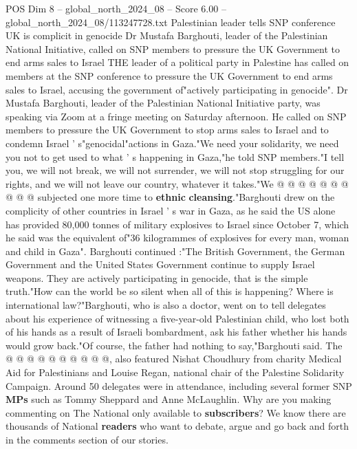 \begin{textsample}{POS Dim 8 – global\_north\_2024\_08 – Score 6.00 – global\_north\_2024\_08/113247728.txt}  \label{ex:f8_pos_321}
Palestinian leader tells SNP conference UK is complicit in genocide Dr Mustafa Barghouti, leader of the Palestinian National Initiative, called on SNP members to pressure the UK Government to end arms sales to Israel THE leader of a political party in Palestine has called on members at the SNP conference to pressure the UK Government to end arms sales to Israel, accusing the government of"actively participating in genocide".
Dr Mustafa Barghouti, leader of the Palestinian National Initiative party, was speaking via Zoom at a fringe meeting on Saturday afternoon.
He called on SNP members to pressure the UK Government to stop arms sales to Israel and to condemn Israel ' s"genocidal"actions in Gaza."We need your solidarity, we need you not to get used to what ' s happening in Gaza,"he told SNP members."I tell you, we will not break, we will not surrender, we will not stop struggling for our rights, and we will not leave our country, whatever it takes."We @ @ @ @ @ @ @ @ @ @ subjected one more time to \textbf{ethnic} \textbf{cleansing}."Barghouti drew on the complicity of other countries in Israel ' s war in Gaza, as he said the US alone has provided 80,000 tonnes of military explosives to Israel since October 7, which he said was the equivalent of"36 kilogrammes of explosives for every man, woman and child in Gaza".
Barghouti continued :"The British Government, the German Government and the United States Government continue to supply Israel weapons.
They are actively participating in genocide, that is the simple truth."How can the world be so silent when all of this is happening?
Where is international law?"Barghouti, who is also a doctor, went on to tell delegates about his experience of witnessing a five-year-old Palestinian child, who lost both of his hands as a result of Israeli bombardment, ask his father whether his hands would grow back."Of course, the father had nothing to say,"Barghouti said.
The @ @ @ @ @ @ @ @ @ @, also featured Nishat Choudhury from charity Medical Aid for Palestinians and Louise Regan, national chair of the Palestine Solidarity Campaign.
Around 50 delegates were in attendance, including several former SNP \textbf{MPs} such as Tommy Sheppard and Anne McLaughlin.
Why are you making commenting on The National only available to \textbf{subscribers}?
We know there are thousands of National \textbf{readers} who want to debate, argue and go back and forth in the comments section of our stories.

\end{textsample}
